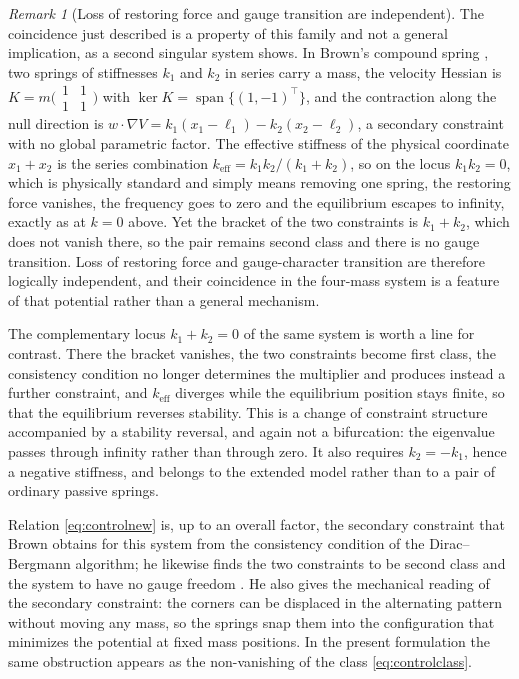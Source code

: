\documentclass[12pt]{article}
\theoremstyle{plain}
\theoremstyle{definition}
\theoremstyle{remark}
\newtheorem{remark}[theorem]{Remark}
\DeclareMathOperator{\spn}{span}
\begin{document}
	\begin{remark}[Loss of restoring force and gauge transition are independent]
		\label{rem:c1c3}
		The coincidence just described is a property of this family and not a
		general implication, as a second singular system shows. In Brown's compound
		spring \cite{Brown2023}, two springs of stiffnesses $k_{1}$ and $k_{2}$ in
		series carry a mass, the velocity Hessian is
		$K=m\bigl(\begin{smallmatrix}1&1\\1&1\end{smallmatrix}\bigr)$ with
		$\ker K=\spn\{(1,-1)^{\top}\}$, and the contraction along the null direction
		is $w\!\cdot\!\nabla V=k_{1}(x_{1}-\ell_{1})-k_{2}(x_{2}-\ell_{2})$, a
		secondary constraint with no global parametric factor. The effective
		stiffness of the physical coordinate $x_{1}+x_{2}$ is the series combination
		$k_{\mathrm{eff}}=k_{1}k_{2}/(k_{1}+k_{2})$, so on the locus $k_{1}k_{2}=0$,
		which is physically standard and simply means removing one spring, the
		restoring force vanishes, the frequency goes to zero and the equilibrium
		escapes to infinity, exactly as at $k=0$ above. Yet the bracket of the two
		constraints is $k_{1}+k_{2}$, which does not vanish there, so the pair
		remains second class and there is no gauge transition. Loss of restoring
		force and gauge-character transition are therefore logically independent,
		and their coincidence in the four-mass system is a feature of that potential
		rather than a general mechanism.
		
		The complementary locus $k_{1}+k_{2}=0$ of the same system is worth a line
		for contrast. There the bracket vanishes, the two constraints become first
		class, the consistency condition no longer determines the multiplier and
		produces instead a further constraint, and $k_{\mathrm{eff}}$ diverges while
		the equilibrium position stays finite, so that the equilibrium reverses
		stability. This is a change of constraint structure accompanied by a
		stability reversal, and again not a bifurcation: the eigenvalue passes
		through infinity rather than through zero. It also requires
		$k_{2}=-k_{1}$, hence a negative stiffness, and belongs to the extended
		model rather than to a pair of ordinary passive springs.
	\end{remark}
	
	Relation \eqref{eq:controlnew} is, up to an overall factor, the secondary
	constraint that Brown obtains for this system from the consistency condition of
	the Dirac--Bergmann algorithm; he likewise finds the two constraints to be
	second class and the system to have no gauge freedom \cite{Brown2023}. He also
	gives the mechanical reading of the secondary constraint: the corners can be
	displaced in the alternating pattern without moving any mass, so the springs
	snap them into the configuration that minimizes the potential at fixed mass
	positions. In the present formulation the same obstruction appears as the
	non-vanishing of the class \eqref{eq:controlclass}.
	
\end{document}
